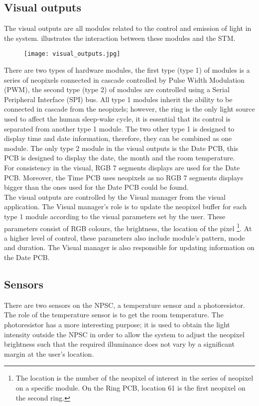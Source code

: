 \subsection{Visual outputs}
The visual outputs are all modules related to the control and emission of light in the system.  illustrates the interaction between these modules and the STM. 
\begin{figure}[ht]
\centering
\texttt{[image: visual\_outputs.jpg]}
\caption{}
\label{fig:visual_outputs}
\end{figure}
There are two types of hardware modules, the first type (type 1) of modules is a series of neopixels connected in cascade controlled by Pulse Width Modulation (PWM), the second type (type 2) of modules are controlled using a Serial Peripheral Interface (SPI) bus. All type 1 modules inherit the ability to be connected in cascade from the neopixels; however, the ring is the only light source used to affect the human sleep-wake cycle, it is essential that its control is separated from another type 1 module. The two other type 1 is designed to display time and date information, therefore, they can be combined as one module. The only type 2 module in the visual outputs is the Date PCB, this PCB is designed to display the date, the month and the room temperature.\\
For consistency in the visual, RGB 7 segments displays are used for the Date PCB. Moreover, the Time PCB uses neopixels as no RGB 7 segments displays bigger than the ones used for the Date PCB could be found.\\
The visual outputs are controlled by the Visual manager from the visual application. The Visual manager's role is to update the neopixel buffer for each type 1 module according to the visual parameters set by the user. These parameters consist of RGB colours, the brightness, the location of the pixel \footnote{The location is the number of the neopixel of interest in the series of neopixel on a specific module. On the Ring PCB, location 61 is the first neopixel on the second ring.}. At a higher level of control, these parameters also include module's pattern, mode and duration. The Visual manager is also responsible for updating information on the Date PCB.   

\subsection{Sensors}
There are two sensors on the NPSC, a temperature sensor and a photoresistor. The role of the temperature sensor is to get the room temperature. The photoresistor has a more interesting purpose; it is used to obtain the light intensity outside the NPSC in order to allow the system to adjust the neopixel brightness such that the required illuminance does not vary by a significant margin at the user's location.



